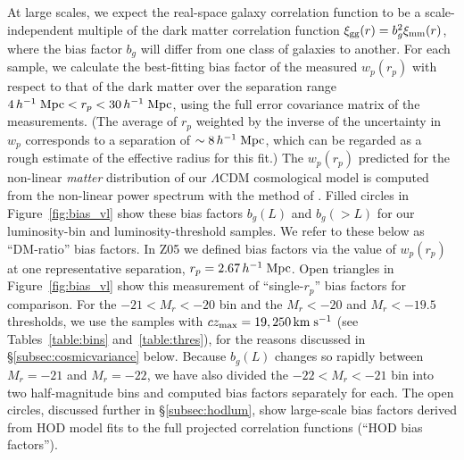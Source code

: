 \documentclass[]{emulateapj}
\newcommand{\kms}{\,{\rm km}\;{\rm s}^{-1}}
\newcommand{\hmpc}{\,h^{-1}\;{\rm Mpc}}
\newcommand{\wrp}{{w_p(r_p)}}
\begin{document}
At large scales, we expect the real-space galaxy correlation function
to be a scale-independent multiple of the dark matter correlation
function $\xi_{\rm gg}(r) = b_g^2\xi_{\rm mm}(r)$, where the bias factor
$b_g$ will differ from one class of galaxies to another.
For each sample, we calculate the best-fitting bias factor of the measured 
$\wrp$ with respect to that of the dark matter over the  separation range 
$4 \hmpc < r_p < 30 \hmpc$, using the full error covariance matrix of the
measurements.  
(The average of $r_p$ weighted by the inverse of the uncertainty in $w_p$
corresponds to a separation of $\sim 8 \hmpc$, which can be regarded as a 
rough estimate of the effective radius for this fit.)
The $\wrp$ predicted for the non-linear {\it matter} 
distribution of our $\Lambda$CDM cosmological model is computed from the 
non-linear power spectrum with the method of \citealt{smith03}.
Filled circles in Figure~\ref{fig:bias_vl} show these bias factors
$b_g(L)$ and $b_g(>L)$ for our luminosity-bin and luminosity-threshold
samples. We refer to these below as ``DM-ratio'' bias factors.
%
In Z05 we defined bias factors via the value of $\wrp$ at one representative
separation,
$r_p=2.67\hmpc$.  Open triangles in Figure~\ref{fig:bias_vl} show this
measurement of ``single-$r_p$'' bias factors for comparison.  
For the $-21<M_r<-20$ bin and the $M_r<-20$ and $M_r<-19.5$ thresholds, we 
use the samples
with $cz_{\rm max}=19,250\kms$ (see Tables~\ref{table:bins} 
and~\ref{table:thres}), for the reasons discussed in 
\S\ref{subsec:cosmicvariance} below.
Because $b_g(L)$ changes so rapidly between $M_r=-21$ and
$M_r=-22$, we have also divided the $-22<M_r<-21$ bin into two
half-magnitude bins and computed bias factors separately for each.
The open circles, discussed further
in \S\ref{subsec:hodlum}, show large-scale bias factors derived
from HOD model fits to the full projected correlation functions
(``HOD bias factors'').
\end{document}
